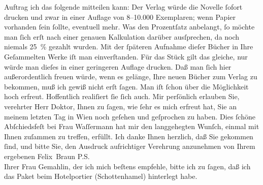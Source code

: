 \begin{ledgroupsized}[t]{13cm}
                    Auftrag ich das folgende mitteilen kann:\pend
           \pstart
           Der Verlag würde die Novelle ſofort drucken und
                    zwar in einer Auflage von 8–10.000 Exemplaren; wenn Papier vorhanden ſein
                    ſollte, eventuell mehr. Was den Prozentſatz anbelangt, ſo möchte man ſich erſt
                    nach einer genauen Kalkulation darüber ausſprechen, da noch niemals 25 {\%} gezahlt wurden. Mit der ſpäteren Aufnahme dieſer
                    Bücher in Ihre Geſammelten Werke iſt man
                    einverſtanden. Für das Stück
                    gilt das gleiche, nur würde man dieſes in einer geringeren Auflage drucken.\pend
           \pstart
           Daß man ſich hier außerordentlich freuen würde, wenn es gelänge, Ihre neuen
                    Bücher zum Verlag zu
                    bekommen, muß ich gewiß nicht erſt ſagen. Man iſt ſchon über die Möglichkeit
                    hoch erfreut. Hoffentlich realiſiert ſie ſich auch.\pend
           \pstart
           {\pb}Mir perſönlich erlauben Sie, verehrter Herr
                    Doktor, Ihnen zu ſagen, wie ſehr es mich erfreut hat, Sie an meinem letzten Tag
                    in Wien noch geſehen und geſprochen zu haben.
                    Dies ſchöne Abſchiedsfeſt bei Frau Waſſermann hat mir den langgehegten Wunſch, einmal mit Ihnen zuſammen
                    zu treffen, erfüllt. Ich danke Ihnen herzlich, daß Sie gekommen ſind, und bitte
                    Sie, den Ausdruck aufrichtiger Verehrung anzunehmen von Ihrem ergebenen\pend
           \pstart \spacefill\mbox{Felix Braun}\pend{}\pstart
           \noindent{}P.S.{\\}Ihrer Frau
                            Gemahlin, der ich mich beſtens empfehle, bitte ich zu ſagen, daß
                        ich das Paket beim Hotelportier (Schottenhamel) hinterlegt habe.\pend
           

\end{ledgroupsized}
